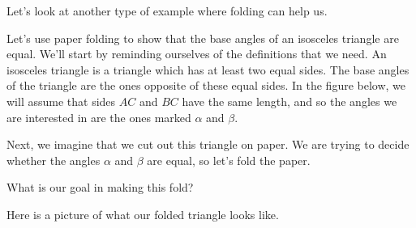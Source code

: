 \documentclass{ximera}
\begin{document}
Let's look at another type of example where folding can help us.
\begin{example}
Let's use paper folding to show that the base angles of an isosceles triangle are equal. We'll start by reminding ourselves of the definitions that we need. An isosceles triangle is a triangle which has at least two equal sides. The base angles of the triangle are the ones opposite of these equal sides. In the figure below, we will assume that sides $AC$ and $BC$ have the same length, and so the angles we are interested in are the ones marked $\alpha$ and $\beta$.
\begin{center}
\end{center}
Next, we imagine that we cut out this triangle on paper. We are trying to decide whether the angles $\alpha$ and $\beta$ are equal, so let's fold the paper.
\begin{question}
	What is our goal in making this fold?
	\begin{multipleChoice}
	\end{multipleChoice}
\end{question}
Here is a picture of what our folded triangle looks like.
\begin{center}
\end{center}
\end{example}
\end{document}
